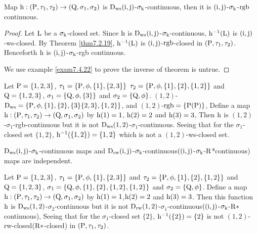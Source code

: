 \begin{thm}\label{thm7.4.21}
Map $\mathrm{h}:(\mathrm{P}, \tau_1, \tau_2 )\to (\mathrm{Q}, \sigma_{1}, \sigma_{2} )$ is $\mathrm{D}_{\mathrm{ws}} (\mathrm{i}, \mathrm{j})$-$\sigma_{\mathrm{k}}$-continuous, then it is $(\mathrm{i}, \mathrm{j})$-$\sigma_{\mathrm{k}}$-$\mathrm{rgb}$ continuous.
\end{thm}

\begin{proof}
Let $\mathrm{L}$ be a $\sigma_{\mathrm{k}}$-closed set. Since $\mathrm{h}$ is $\mathrm{D}_{\mathrm{ws}} (\mathrm{i}, \mathrm{j})$-$\sigma_{\mathrm{k}}$-continuous, $\mathrm{h}^{-1} (\mathrm{L})$ is $(\mathrm{i}, \mathrm{j})$-ws-closed. By Theorem \ref{thm7.2.19}, $\mathrm{h}^{-1} (\mathrm{L})$ is $(\mathrm{i}, \mathrm{j})$-$\mathrm{rgb}$-closed in $(\mathrm{P}, \tau_1, \tau_2 )$. Henceforth $\mathrm{h}$ is $(\mathrm{i}, \mathrm{j})$-$\sigma_{\mathrm{k}}$-rgb continuous.

We use example \ref{exam7.4.22} to prove the inverse of theorem is untrue.
\end{proof}

\begin{exm}\label{exam7.4.22}
Let $\mathrm{P}=\{1,2,3\}$, $\tau_1 =\{\mathrm{P}, \phi, \{1\}, \{2,3\}\}$ $\tau_2 =\{\TSP, \phi, \{1\},\{2\},\break \{1,2\}\}$ and $\mathrm{Q}=\{1,2,3\}$, $\sigma_{1} =\{\mathrm{Q}, \phi, \{3\}\}$ and $\sigma_{2} =\{\mathrm{Q}, \phi\}$. $(1,2)$-$\clrD_{\ws} =\{\TSP, \phi, \{1\},\break \{2\},\{3\}\{2,3\},\{1,2\}\}$, and $(1,2)$-$\mathrm{rgb} =\{\mathrm{P}(\mathrm{P})\}$, Define a map $\mathrm{h}:(\mathrm{P}, \tau_1, \tau_2 )\to (\mathrm{Q}, \sigma_{1}, \sigma_{2} )$ by $\mathrm{h}(1)=1$, $\mathrm{h}(2)=2$ and $\mathrm{h}(3)=3$, Then $\mathrm{h}$ is $(1, 2)$-$\sigma_{1}$-rgb-continuous but it is not $\mathrm{D}_{\mathrm{ws}} (1, 2)$-$\sigma_{1}$-continuous. Seeing that for the $\sigma_{1}$-closed set $\{1,2\}$, $\mathrm{h}^{-1} (\{1,2\})=\{1,2\}$ which is not a $(1, 2)$-ws-closed set.
\end{exm}

\begin{rem}\label{rem7.4.23}
$\mathrm{D}_{\mathrm{ws}} (\mathrm{i}, \mathrm{j})$-$\sigma_{\mathrm{k}}$-continuous maps and $\mathrm{D}_{\mathrm{rw}} (\mathrm{i}, \mathrm{j})$-$\sigma_{\mathrm{k}}$-continuous$((\mathrm{i}, \mathrm{j})$-$\sigma_{\mathrm{k}}$-{\break}$\mathrm{R}$*continuous) maps are independent.
\end{rem}

\begin{exm}\label{exam7.4.24}
Let $\mathrm{P}=\{1,2,3\}$, $\tau_1 =\{\mathrm{P}, \phi, \{1\}, \{2,3\}\}$ and $\tau_2 =\{\TSP, \phi, \{1\},\{2\},\break \{1,2\}\}$ and $\mathrm{Q}=\{1,2,3\}$, $\sigma_{1} =\{\mathrm{Q}, \phi,\{1\},\{2\},\{1,2\},\{1,2\}\}$ and $\sigma_{2} =\{\mathrm{Q}, \phi\}$. Define a map $\mathrm{h}:(\mathrm{P}, \tau_1, \tau_2 )\to (\mathrm{Q}, \sigma_{1},\sigma_{2} )$ by $\mathrm{h}(1)=1$,$\mathrm{h}(2)=2$ and $\mathrm{h}(3)=3$. Then this function $\mathrm{h}$ is $\mathrm{D}_{\mathrm{ws}} (1, 2)$-$\sigma_{2}$-continuous but it is not $\mathrm{D}_{\mathrm{rw}}(1, 2)$-$\sigma_{1}$-continuous$((\mathrm{i}, \mathrm{j})$-$\sigma_{\mathrm{k}}$-$\mathrm{R}*$continuous), Seeing that for the $\sigma_{1}$-closed set $\{2\}$, $\mathrm{h}^{-1} (\{2\})=\{2\}$ is not $(1, 2)$-rw-closed($\mathrm{R}*$-closed) in $(\mathrm{P}, \tau_1, \tau_2 )$. 
\end{exm}

